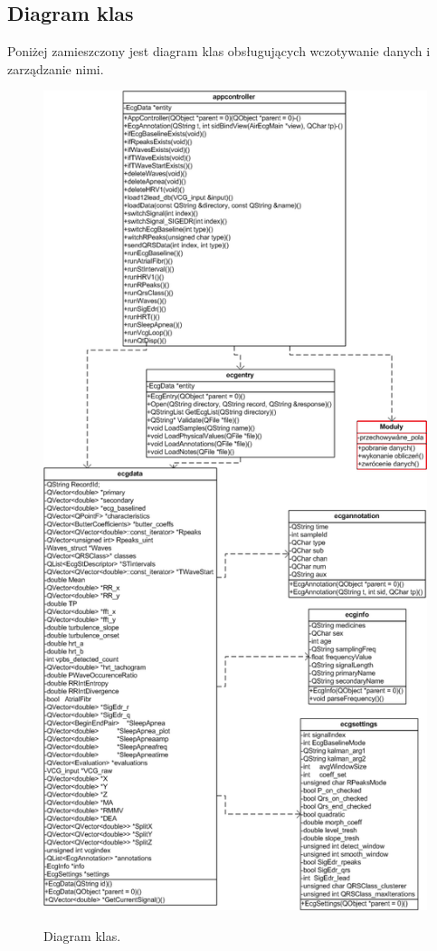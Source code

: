 \subsection{Diagram klas}
Poniżej zamieszczony jest diagram klas obsługujących wczotywanie danych i zarządzanie nimi.

\begin{figure}[H]
\centering
\includegraphics[scale=0.7]{MVC/img/diagram_klas}
\label{fig:diagrami}
\caption{Diagram klas.}
\end{figure}